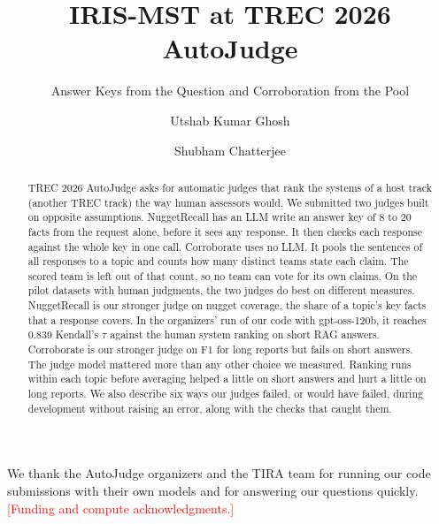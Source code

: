 \documentclass[sigconf,nonacm]{acmart}
\newcommand{\pending}[1]{\textcolor{red}{[#1]}}
\newcommand{\judge}[1]{\textsf{#1}}
\begin{document}
\title{IRIS-MST at TREC 2026 AutoJudge}
\subtitle{Answer Keys from the Question and Corroboration from the Pool}

\author{Utshab Kumar Ghosh}

\author{Shubham Chatterjee}
\renewcommand{\shortauthors}{IRIS-MST at TREC 2026 AutoJudge}

\begin{abstract}
TREC 2026 AutoJudge asks for automatic judges that rank the systems of a host
track (another TREC track) the way human assessors would. We submitted two judges
built on opposite assumptions. \judge{NuggetRecall} has an LLM write an answer key
of 8 to 20 facts from the request alone, before it sees any response. It then
checks each response against the whole key in one call. \judge{Corroborate}
uses no LLM. It pools the sentences of all responses to a topic and counts how many
distinct teams state each claim. The scored team is left out of that count, so no
team can vote for its own claims. On the pilot datasets with human judgments, the two
judges do best on different measures. \judge{NuggetRecall} is our stronger judge on
nugget coverage, the share of a topic's key facts that a response covers. In the
organizers' run of our code with gpt-oss-120b, it reaches 0.839 Kendall's $\tau$
against the human system ranking on short RAG answers.
\judge{Corroborate} is our stronger judge on F1 for long reports but fails on short
answers. The judge model mattered more than any other choice we measured. Ranking
runs within each topic before averaging helped a little on short answers and hurt a
little on long reports. We also describe six ways our judges failed, or would have
failed, during development without raising an error, along with the checks that
caught them.
\end{abstract}


\maketitle












\begin{acks}
We thank the AutoJudge organizers and the TIRA team for running our code
submissions with their own models and for answering our questions quickly.
\pending{Funding and compute acknowledgments.}
\end{acks}




\appendix

\end{document}
